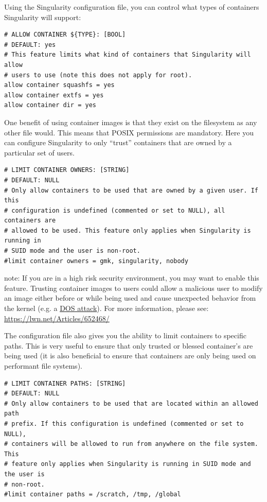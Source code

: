 \documentclass[a4paper]{article}
\newcounter{subsubsubsection}[subsubsection]
\begin{document}
Using the Singularity configuration file, you can control what types of containers Singularity will support:

\begin{lstlisting}[frame=single]
# ALLOW CONTAINER ${TYPE}: [BOOL]
# DEFAULT: yes
# This feature limits what kind of containers that Singularity will allow
# users to use (note this does not apply for root).
allow container squashfs = yes
allow container extfs = yes
allow container dir = yes

\end{lstlisting}


One benefit of using container images is that they exist on the filesystem as any other file would. This means that POSIX permissions are mandatory. Here you can configure Singularity to only “trust” containers that are owned by a particular set of users.\\[0.1in]

\begin{lstlisting}[frame=single]
# LIMIT CONTAINER OWNERS: [STRING]
# DEFAULT: NULL
# Only allow containers to be used that are owned by a given user. If this
# configuration is undefined (commented or set to NULL), all containers are
# allowed to be used. This feature only applies when Singularity is running in
# SUID mode and the user is non-root.
#limit container owners = gmk, singularity, nobody

\end{lstlisting}

note: If you are in a high risk security environment, you may want to enable this feature. Trusting container images to users could allow a malicious user to modify an image either before or while being used and cause unexpected behavior from the kernel (e.g. a \href{https://en.wikipedia.org/wiki/Denial-of-service_attack}{DOS attack}). For more information, please see: \href{https://lwn.net/Articles/652468/}{https://lwn.net/Articles/652468/}


The configuration file also gives you the ability to limit containers to specific paths. This is very useful to ensure that only trusted or blessed container’s are being used (it is also beneficial to ensure that containers are only being used on performant file systems).

\begin{lstlisting}[frame=single]
# LIMIT CONTAINER PATHS: [STRING]
# DEFAULT: NULL
# Only allow containers to be used that are located within an allowed path
# prefix. If this configuration is undefined (commented or set to NULL),
# containers will be allowed to run from anywhere on the file system. This
# feature only applies when Singularity is running in SUID mode and the user is
# non-root.
#limit container paths = /scratch, /tmp, /global
\end{lstlisting}
\end{document}

